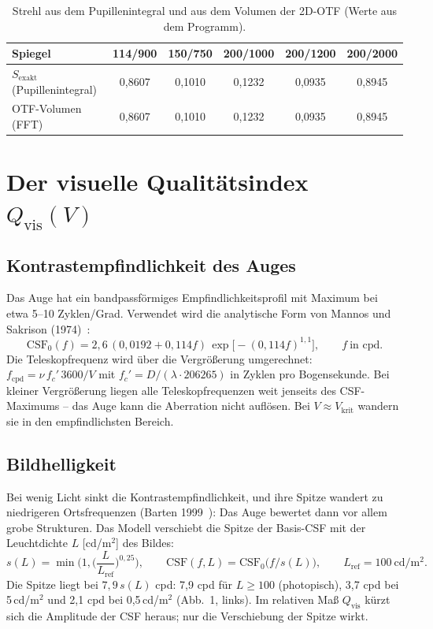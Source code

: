 \documentclass[11pt,a4paper]{article}
\newcommand{\Qvis}{Q_{\mathrm{vis}}}
\newcommand{\Vkrit}{V_{\mathrm{krit}}}
\begin{document}
\begin{table}[ht]
\centering
\begin{tabular}{lccccc}
\toprule
Spiegel & 114/900 & 150/750 & 200/1000 & 200/1200 & 200/2000\\
\midrule
$S_{\mathrm{exakt}}$ (Pupillenintegral) & 0,8607 & 0,1010 & 0,1232 & 0,0935 & 0,8945\\
OTF-Volumen (FFT) & 0,8607 & 0,1010 & 0,1232 & 0,0935 & 0,8945\\
\bottomrule
\end{tabular}
\caption{Strehl aus dem Pupillenintegral und aus dem Volumen der 2D-OTF (Werte aus dem Programm).}
\end{table}

\section{Der visuelle Qualitätsindex \texorpdfstring{$\Qvis(V)$}{Qvis(V)}}
\subsection{Kontrastempfindlichkeit des Auges}
Das Auge hat ein bandpassförmiges Empfindlichkeitsprofil mit Maximum bei etwa 5--10 Zyklen/Grad. Verwendet wird die analytische Form von Mannos und Sakrison (1974)~\cite{mannos}:
\begin{equation}
\mathrm{CSF}_0(f)=2{,}6\,(0{,}0192+0{,}114f)\,\exp\!\big[-(0{,}114f)^{1{,}1}\big],\qquad f\ \text{in cpd}.
\end{equation}
Die Teleskopfrequenz wird über die Vergrößerung umgerechnet: $f_{\mathrm{cpd}}=\nu\,f_c'\,3600/V$ mit $f_c'=D/(\lambda\cdot206265)$ in Zyklen pro Bogensekunde. Bei kleiner Vergrößerung liegen alle Teleskopfrequenzen weit jenseits des CSF-Maximums -- das Auge kann die Aberration nicht auflösen. Bei $V\approx\Vkrit$ wandern sie in den empfindlichsten Bereich.

\subsection{Bildhelligkeit}
Bei wenig Licht sinkt die Kontrastempfindlichkeit, und ihre Spitze wandert zu niedrigeren Ortsfrequenzen (Barten 1999~\cite{barten}): Das Auge bewertet dann vor allem grobe Strukturen. Das Modell verschiebt die Spitze der Basis-CSF mit der Leuchtdichte $L$ [cd/m$^2$] des Bildes:
\begin{equation}
s(L)=\min\!\Big(1,\Big(\frac{L}{L_{\mathrm{ref}}}\Big)^{0{,}25}\Big),\qquad \mathrm{CSF}(f,L)=\mathrm{CSF}_0\!\big(f/s(L)\big),\qquad L_{\mathrm{ref}}=100\ \mathrm{cd/m^2}.
\end{equation}
Die Spitze liegt bei $7{,}9\,s(L)$ cpd: 7,9 cpd für $L\ge100$ (photopisch), 3,7 cpd bei 5\,cd/m$^2$ und 2,1 cpd bei 0,5\,cd/m$^2$ (Abb.~1, links). Im relativen Maß $\Qvis$ kürzt sich die Amplitude der CSF heraus; nur die Verschiebung der Spitze wirkt.
\end{document}
